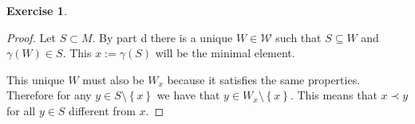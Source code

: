 \documentclass{article}
\theoremstyle{definition}
\newtheorem{question}{Exercise}
\newcommand{\set}[1]{\left\{#1\right\}}
\begin{document}
\begin{question}
\begin{enumerate}[a.,resume]
              \begin{proof}
                  Let \(S\subset M\). By part d there is a unique
                  \(W\in\mathcal{W}\) such that \(S\subseteq W\) and
                  \(\gamma(W)\in S\). This \(x:=\gamma(S)\) will be the minimal
                  element.

                  This unique \(W\) must also be \(W_{x}\) because it satisfies
                  the same properties. Therefore for any \(y\in
                  S\setminus\set{x}\) we have that \(y\in
                  W_{x}\setminus\set{x}\). This means that \(x\prec y\)
                  for all \(y\in S\) different from \(x\).
              \end{proof}
    \end{enumerate}
\end{question}
\end{document}
